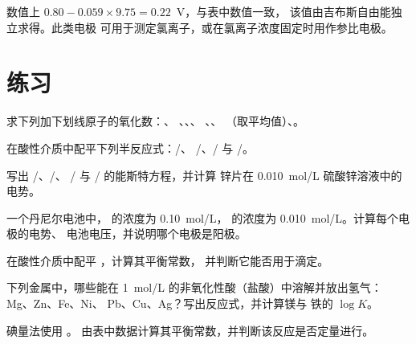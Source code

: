 数值上 $0.80 - 0.059 \times 9.75 = 0.22$~V，与表中数值一致，
该值由吉布斯自由能独立求得。此类电极
可用于测定氯离子，或在氯离子浓度固定时用作参比电极。

\section{练习}

\begin{exercise}[$\star$]\label{exo:b1:nernst:1}
求下列加下划线原子的氧化数：、
、、、
、、
（取平均值）、。
\end{exercise}

\begin{exercise}[$\star$]\label{exo:b1:nernst:2}
在酸性介质中配平下列半反应式：/、
/、/ 与 /。
\end{exercise}

\begin{exercise}[$\star$]\label{exo:b1:nernst:3}
写出 /、/、
/ 与 / 的能斯特方程，并计算
锌片在 \qty{0.010}{mol/L} 硫酸锌溶液中的电势。
\end{exercise}

\begin{exercise}[$\star$]\label{exo:b1:nernst:4}
一个丹尼尔电池中， 的浓度为 \qty{0.10}{mol/L}， 的浓度为
\qty{0.010}{mol/L}。计算每个电极的电势、
电池电压，并说明哪个电极是阳极。
\end{exercise}

\begin{exercise}[$\star\star$]\label{exo:b1:nernst:5}
在酸性介质中配平 ，计算其平衡常数，
并判断它能否用于滴定。
\end{exercise}

\begin{exercise}[$\star\star$]\label{exo:b1:nernst:6}
下列金属中，哪些能在 \qty{1}{mol/L} 的非氧化性酸（盐酸）中溶解并放出氢气：
Mg、Zn、Fe、Ni、
Pb、Cu、Ag？写出反应式，并计算镁与
铁的 $\log K$。
\end{exercise}

\begin{exercise}[$\star\star$]\label{exo:b1:nernst:7}
碘量法使用 。
由表中数据计算其平衡常数，并判断该反应是否定量进行。
\end{exercise}

